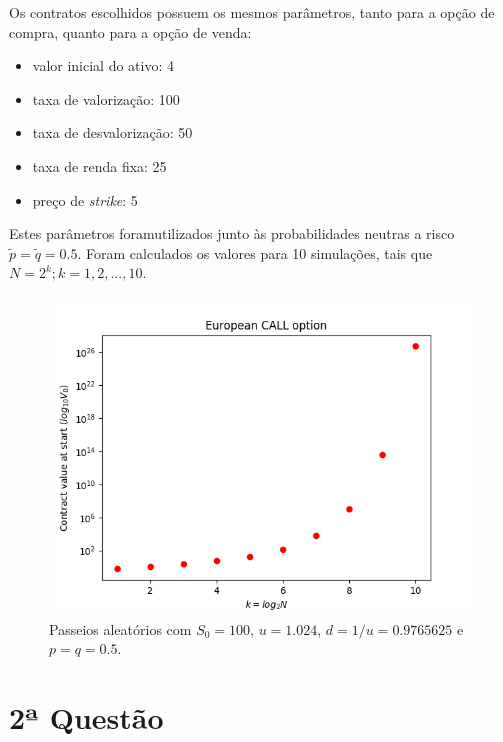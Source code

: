 \documentclass{article}
\begin{document}
Os contratos escolhidos possuem os mesmos parâmetros, tanto para a opção de compra, quanto para a opção de venda:

\begin{itemize}
	\item valor inicial do ativo: 4
	\item taxa de valorização: 100%
	\item taxa de desvalorização: 50%
	\item taxa de renda fixa: 25%
	\item preço de \emph{strike}: 5
\end{itemize}

Estes parâmetros foramutilizados junto às probabilidades neutras a risco $\tilde{p} = \tilde{q} = 0.5$.
Foram calculados os valores para 10 simulações, tais que $N = 2^{k}; k = 1, 2, ..., 10$.



\begin{figure}[]
	\includegraphics[width=\linewidth]{Figure_1.png}
	\centering
	
	\caption{Passeios aleatórios com $S_{0} = 100$, $u = 1.024$, $d = 1/u = 0.9765625$ e $p = q = 0.5$.}
	\label{}
\end{figure}



\section*{2ª Questão}
\end{document}
